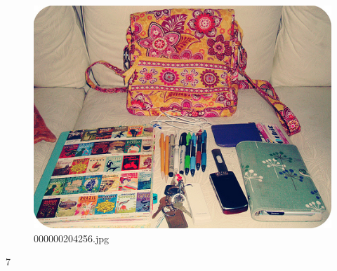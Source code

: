 \begin{figure}[h]
    \centering
    \includegraphics[width=0.8\linewidth]{../image set/hard/000000204256.jpg}
    \caption{000000204256.jpg}
\end{figure}7
